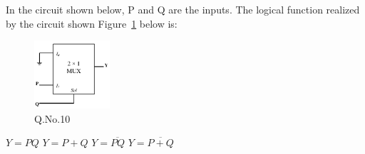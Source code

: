 \documentclass[a4, 12pt, addpoints]{exam}
\begin{document}
\begin{questions}
\question In the circuit shown below, P and Q are the inputs. The logical function realized by the circuit shown Figure~\ref{fig:2} below is:
\begin{figure}[H]
\centering
\includegraphics[width=0.25\textwidth]{mux}
\caption{Q.No.10}
\label{fig:2}
\end{figure}
\begin{oneparchoices}
    \choice $Y = PQ$
    \choice $Y=P+Q$
    \choice $Y = \overline{PQ}$
    \CorrectChoice $Y= \overline{P + Q}$
    
\end{oneparchoices}



\vspace{0.10in}

\end{questions}
\end{document}
